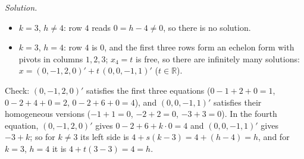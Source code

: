 \documentclass[12pt]{article}
\newcommand{\R}{\mathbb R}
\theoremstyle{definition}
\newenvironment{solution}{\par\noindent\textit{Solution.}\ }{\par\smallskip}
\begin{document}
\begin{solution}
\begin{itemize}
with \(s=\frac{h-4}{k-3}\): \(x_4=s\), \(x_3=2-s\), \(x_2=1-x_3-x_4=-1\),
\(x_1=1-x_2-x_3-x_4=0\), that is, \(x=(0,-1,2,0)'+s\,(0,0,-1,1)'\).
\item \(k=3\), \(h\ne4\): row \(4\) reads \(0=h-4\ne0\), so there is no solution.
\item \(k=3\), \(h=4\): row \(4\) is \(0\), and the first three rows form an echelon form with
pivots in columns \(1,2,3\); \(x_4=t\) is free, so there are infinitely many solutions:
\(x=(0,-1,2,0)'+t\,(0,0,-1,1)'\) (\(t\in\R\)).
\end{itemize}
Check: \((0,-1,2,0)'\) satisfies the first three equations (\(0-1+2+0=1\),
\(0-2+4+0=2\), \(0-2+6+0=4\)), and \((0,0,-1,1)'\) satisfies their homogeneous versions
(\(-1+1=0\), \(-2+2=0\), \(-3+3=0\)). In the fourth equation, \((0,-1,2,0)'\) gives \(0-2+6+k\cdot0=4\) and
\((0,0,-1,1)'\) gives \(-3+k\); so for \(k\ne3\) its left side is \(4+s(k-3)=4+(h-4)=h\),
and for \(k=3\), \(h=4\) it is \(4+t(3-3)=4=h\).
\end{solution}
\end{document}
